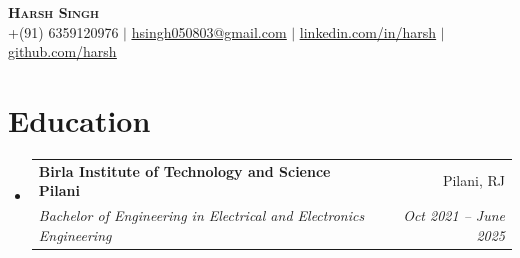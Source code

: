 \documentclass[letterpaper,11pt]{article}
\makeatletter
\newcommand{\resumeSubheading}[4]{
  \vspace{-2pt}\item
    \begin{tabular*}{0.97\textwidth}[t]{l@{\extracolsep{\fill}}r}
      \textbf{#1} & #2 \\
      \textit{\small#3} & \textit{\small #4} \\
    \end{tabular*}\vspace{-7pt}
}
\newcommand{\resumeSubHeadingListStart}{\begin{itemize}[leftmargin=0.15in, label={}]}
\newcommand{\resumeSubHeadingListEnd}{\end{itemize}}
\makeatother
\begin{document}

\begin{center}
    \textbf{\Huge \scshape Harsh Singh} \\ \vspace{1pt}
    \small +(91) 6359120976 $|$ \href{mailto:x@x.com}{\underline{hsingh050803@gmail.com}} $|$ 
    \href{www.linkedin.com/in/harshsingh58}{\underline{linkedin.com/in/harsh}} $|$
    \href{https://github.com/dm4p385}{\underline{github.com/harsh}}
\end{center}


\section{Education}
  \resumeSubHeadingListStart
    \resumeSubheading
      {Birla Institute of Technology and Science Pilani}{Pilani, RJ}
      {Bachelor of Engineering in Electrical and Electronics Engineering}{Oct 2021 -- June 2025}
  \resumeSubHeadingListEnd


\end{document}
